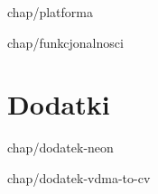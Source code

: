 \documentclass[11pt]{aghdpl}
\author{Wojciech Gumuła}
\date{2017}
\begin{document}
\titlepages

{
	\fancyhf{}
	\renewcommand{\headrulewidth}{0pt}
	\renewcommand{\footrulewidth}{0pt}
}



\setcounter{tocdepth}{1}
\tableofcontents
\clearpage



 {chap/platforma}

 {chap/funkcjonalnosci}








\appendix
\chapter*{Dodatki}
\renewcommand{\thesection}{\Alph{section}}

 {chap/dodatek-neon}

 {chap/dodatek-vdma-to-cv}
\printbibliography
\end{document}
